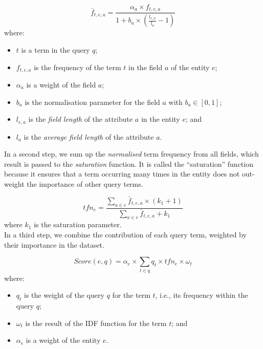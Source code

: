 \begin{equation}
\bar{f}_{t,e,a} = \frac{\alpha_a\times f_{t,e,a}}{1+b_a\times\left(\frac{l_{e,a}}{l_a}-1\right)}
\label{eq:bm25f_1}
\end{equation}
where:
\begin{itemize}
	\item $t$ is a term in the query $q$;
	\item $f_{t,e,a}$ is the frequency of the term $t$ in the field $a$ of the entity $e$;
	\item $\alpha_a$ is a weight of the field $a$;
	\item $b_a$ is the normalisation parameter for the field $a$ with $b_a \in \left[0,1\right]$;
	\item $l_{e,a}$ is the \emph{field length} of the attribute $a$ in the entity $e$; and
	\item $l_a$ is the \emph{average field length} of the attribute $a$.\\
\end{itemize}

In a second step, we sum up the \emph{normalised} term frequency from all fields, which result is passed to the \emph{saturation} function. It is called the ``saturation'' function because it ensures that a term occurring many times in the entity does not out-weight the importance of other query terms.

\begin{equation}
tfn_e = \frac{\sum_{a \in e}{\bar{f}_{t,e,a}}\times(k_1+1)}{\sum_{a \in e}{\bar{f}_{t,e,a}}+k_1}
\label{eq:bm25f_2}
\end{equation}
where $k_1$ is the saturation parameter.\\

In a third step, we combine the contribution of each query term, weighted by their importance in the dataset.

\begin{equation}
Score(e,q) = \alpha_e\times\sum_{t\in q}{q_t\times tfn_e \times \omega_t}
\label{eq:tfidf-score}
\end{equation}
where:
\begin{itemize}
	\item $q_t$ is the weight of the query $q$ for the term $t$, i.e., its frequency within the query $q$;
	\item $\omega_t$ is the result of the IDF function for the term $t$; and
	\item $\alpha_e$ is a weight of the entity $e$.
\end{itemize}

